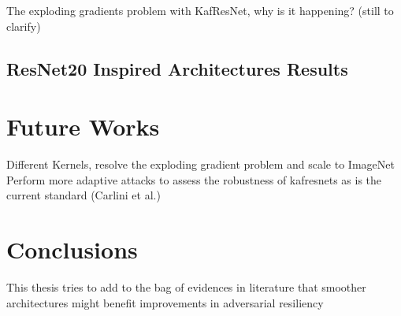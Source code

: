 \documentclass[LaM,binding=0.6cm]{./packages/sapthesis/sapthesis}
\begin{document}
        The exploding gradients problem with KafResNet, why is it happening? (still to clarify)

    \section{ResNet20 Inspired Architectures Results}


\chapter{Future Works}

    Different Kernels, resolve the exploding gradient problem and scale to ImageNet
    Perform more adaptive attacks to assess the robustness of kafresnets as is the current standard (Carlini et al.)


\chapter{Conclusions}

    This thesis tries to add to the bag of evidences in literature that smoother architectures might benefit improvements in adversarial resiliency
    
    
\appendix


\backmatter
\end{document}
